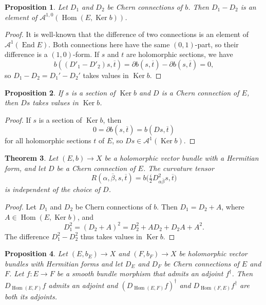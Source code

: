 \documentclass[10pt,a4paper]{amsart}
\newtheorem{theo}{Theorem}[section]
\newtheorem{prop}[theo]{Proposition}
\theoremstyle{definition}
\newcommand{\cc}[1]{\mathcal{#1}}
\def\ov#1{\overline{#1}}
\DeclareMathOperator{\Ker}{Ker}
\DeclareMathOperator{\End}{End}
\DeclareMathOperator{\Hom}{Hom}
\begin{document}
\begin{prop}
Let $D_1$ and $D_2$ be Chern connections of $b$. Then $D_1 - D_2$ is an element of $\cc A^{1,0}(\Hom(E, \Ker b))$.
\end{prop}

\begin{proof}
It is well-known that the difference of two connections is an element of $\cc A^1(\End E)$. Both connections here have the same $(0,1)$-part, so their difference is a $(1,0)$-form. If $s$ and $t$ are holomorphic sections, we have
\[
b((D'_1 - D'_2)s, \ov t)
= \partial b(s, \ov t) - \partial b(s, \ov t) = 0,
\]
so $D_1 - D_2 = D_1' - D_2'$ takes values in $\Ker b$.
\end{proof}


\begin{prop}
If $s$ is a section of $\Ker b$ and $D$ is a Chern connection of $E$, then $Ds$ takes values in $\Ker b$.
\end{prop}

\begin{proof}
If $s$ is a section of $\Ker b$, then
\[
0
= \partial b(s, \ov t)
= b(Ds, \ov t)
\]
for all holomorphic sections $t$ of $E$, so $D s \in \cc A^1(\Ker b)$.
\end{proof}


\begin{theo}
Let $(E, b) \to X$ be a holomorphic vector bundle with a Hermitian form, and let $D$ be a Chern connection of $E$. The curvature tensor
\[
R(\alpha,\ov\beta,s, \ov t)
= b\bigl(\tfrac i2 D^2_{\alpha\ov\beta}s, \ov t\bigr)
\]
is independent of the choice of $D$.
\end{theo}

\begin{proof}
Let $D_1$ and $D_2$ be Chern connections of $b$. Then $D_1 = D_2 + A$, where $A \in \Hom(E, \Ker b)$, and
\[
D_1^2
= (D_2 + A)^2
= D_2^2 + A D_2 + D_2 A + A^2.
\]
The difference $D_1^2 - D_2^2$ thus takes values in $\Ker b$.
\end{proof}




\begin{prop}
\label{prop:hom-adjoint}
Let $(E,b_E) \to X$ and $(F,b_F) \to X$ be holomorphic vector bundles with
Hermitian forms and let $D_E$ and $D_F$ be Chern connections of $E$ and $F$.
Let $f : E \to F$ be a smooth bundle morphism that admits an adjoint
$f^\dagger$. Then $D_{\Hom(E,F)}f$ admits an adjoint and
$(D_{\Hom(E,F)}f)^\dagger$ and $D_{\Hom(F,E)}f^\dagger$ are both its adjoints.
\end{prop}
\end{document}
